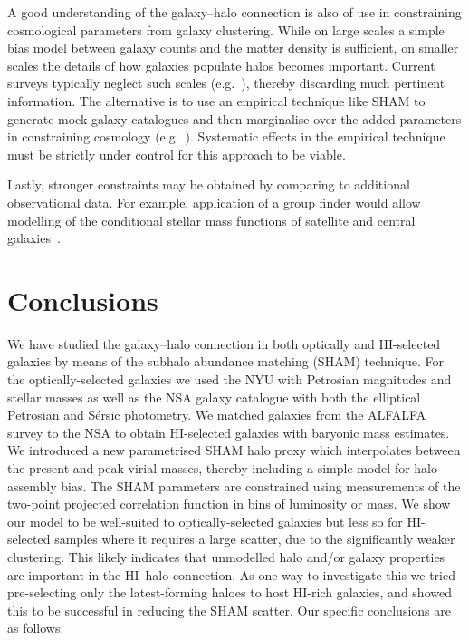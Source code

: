 \documentclass[usenatbib,useAMS]{mnras}
\newcommand{\HI}{\ensuremath{\mathrm{H}\scriptstyle\mathrm{I}}}
\begin{document}
A good understanding of the galaxy--halo connection is also of use in constraining cosmological parameters from galaxy clustering. While on large scales a simple bias model between galaxy counts and the matter density is sufficient, on smaller scales the details of how galaxies populate halos becomes important. Current surveys typically neglect such scales (e.g.~\citet{DES_1, DES_2}), thereby discarding much pertinent information. The alternative is to use an empirical technique like \ac{SHAM} to generate mock galaxy catalogues and then marginalise over the added parameters in constraining cosmology (e.g.~\citet{Reddick_cosmo}). Systematic effects in the empirical technique must be strictly under control for this approach to be viable.

Lastly, stronger constraints may be obtained by comparing to additional observational data. For example, application of a group finder would allow modelling of the conditional stellar mass functions of satellite and central galaxies~\citep{Reddick2013}.

\section{Conclusions}\label{sec:conc}

We have studied the galaxy--halo connection in both optically and $\HI$-selected galaxies by means of the subhalo abundance matching (SHAM) technique. For the optically-selected galaxies we used the \acl{NYU} with Petrosian magnitudes and stellar masses as well as the \acl{NSA} galaxy catalogue with both the elliptical Petrosian and S\'ersic photometry. We matched galaxies from the ALFALFA survey to the \acl{NSA} to obtain $\HI$-selected galaxies with baryonic mass estimates. We introduced a new parametrised \ac{SHAM} halo proxy which interpolates between the present and peak virial masses, thereby including a simple model for halo assembly bias. The \ac{SHAM} parameters are constrained using measurements of the two-point projected correlation function in bins of luminosity or mass. We show our model to be well-suited to optically-selected galaxies but less so for $\HI$-selected samples where it requires a large scatter, due to the significantly weaker clustering. This likely indicates that unmodelled halo and/or galaxy properties are important in the $\HI$--halo connection. As one way to investigate this we tried pre-selecting only the latest-forming haloes to host $\HI$-rich galaxies, and showed this to be successful in reducing the \ac{SHAM} scatter. Our specific conclusions are as follows:
\end{document}
